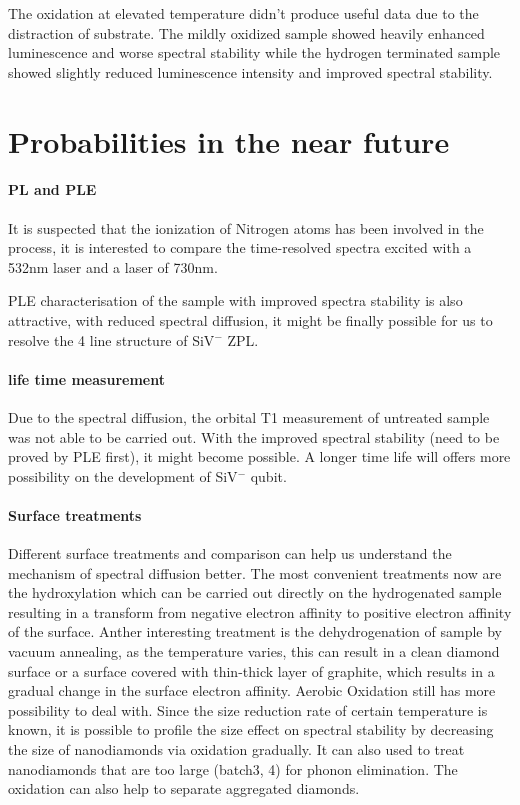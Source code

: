The oxidation at elevated temperature didn't produce useful data due to the distraction of substrate. The mildly oxidized sample showed heavily enhanced luminescence and worse spectral stability while the hydrogen terminated sample showed slightly reduced luminescence intensity and improved spectral stability.

\section{ Probabilities in the near future}

\paragraph{PL and PLE}
It is suspected that the ionization of Nitrogen atoms has been involved in the process, it is interested to compare the time-resolved spectra excited with a 532nm laser and a laser of 730nm.

PLE characterisation of the sample with improved spectra stability is also attractive, with reduced spectral diffusion, it might be finally possible for us to resolve the 4 line structure of SiV$^{-}$ ZPL.

\paragraph{life time measurement}
Due to the spectral diffusion, the orbital T1 measurement of untreated sample was not able to be carried out. With the improved spectral stability (need to be proved by PLE first), it might become possible. A longer time life will offers more possibility on the development of SiV$^{-}$ qubit.

\paragraph{Surface treatments}

Different surface treatments and comparison can help us understand the mechanism of spectral diffusion better. The most convenient treatments now are the hydroxylation which can be carried out directly on the hydrogenated sample resulting in a transform from negative electron affinity to positive electron affinity of the surface.
Anther interesting treatment is the dehydrogenation of sample by vacuum annealing, as the temperature varies, this can result in a clean diamond surface or a surface covered with thin-thick layer of graphite, which results in a gradual change in the surface electron affinity.
Aerobic Oxidation still has more possibility to deal with. Since the size reduction rate of certain temperature is known, it is possible to profile the size effect on spectral stability by decreasing the size of nanodiamonds via oxidation gradually. It can also used to treat nanodiamonds that are too large (batch3, 4) for phonon elimination. The oxidation can also help to separate aggregated diamonds.

